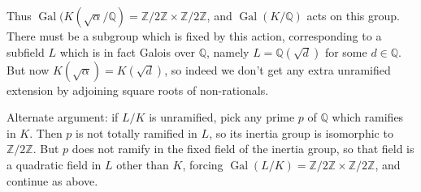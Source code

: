 \documentclass[12pt]{article}
\def\QQ{\mathbb{Q}}
\def\ZZ{\mathbb{Z}}
\DeclareMathOperator{\Gal}{Gal}
\begin{document}
Thus $\Gal(K(\sqrt{\alpha}/\QQ) = \ZZ/2\ZZ \times \ZZ/2\ZZ$, and 
$\Gal(K/\QQ)$ acts on this group. There must be a subgroup which is fixed
by this action, corresponding to a subfield $L$ which is in fact Galois
over $\QQ$, namely $L = \QQ(\sqrt{d})$ for some $d \in \QQ$. But now
$K(\sqrt{\alpha}) = K(\sqrt{d})$, so indeed we don't get any extra
unramified extension by adjoining square roots of non-rationals.

Alternate argument: if $L/K$ is unramified,
pick any prime $p$ of $\QQ$ which ramifies in $K$. Then $p$ is not totally
ramified in $L$, so its inertia group is isomorphic to $\ZZ/2\ZZ$. But
$p$ does not ramify in the fixed field of the inertia group, so that field
is a quadratic field in $L$ other than $K$, forcing $\Gal(L/K) = \ZZ/2\ZZ
\times \ZZ/2\ZZ$, and continue as above.
\end{document}
